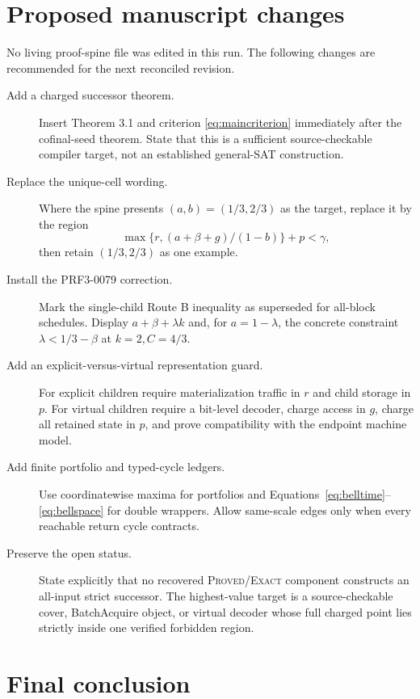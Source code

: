 \documentclass[11pt]{article}
\begin{document}
\section{Proposed manuscript changes}

No living proof-spine file was edited in this run.  The following changes are
recommended for the next reconciled revision.

\begin{description}
\item[Add a charged successor theorem.]
Insert Theorem 3.1 and criterion \eqref{eq:maincriterion} immediately after
the cofinal-seed theorem.  State that this is a sufficient source-checkable
compiler target, not an established general-SAT construction.

\item[Replace the unique-cell wording.]
Where the spine presents $(a,b)=(1/3,2/3)$ as the target, replace it by the
region
\[
 \max\{r,(a+\beta+g)/(1-b)\}+p<\gamma,
\]
then retain $(1/3,2/3)$ as one example.

\item[Install the PRF3-0079 correction.]
Mark the single-child Route B inequality as superseded for all-block
schedules.  Display $a+\beta+\lambda k$ and, for $a=1-\lambda$, the concrete
constraint $\lambda<1/3-\beta$ at $k=2,C=4/3$.

\item[Add an explicit-versus-virtual representation guard.]
For explicit children require materialization traffic in $r$ and child storage
in $p$.  For virtual children require a bit-level decoder, charge access in
$g$, charge all retained state in $p$, and prove compatibility with the
endpoint machine model.

\item[Add finite portfolio and typed-cycle ledgers.]
Use coordinatewise maxima for portfolios and
Equations~\eqref{eq:belltime}--\eqref{eq:bellspace} for double wrappers.  Allow
same-scale edges only when every reachable return cycle contracts.

\item[Preserve the open status.]
State explicitly that no recovered \textsc{Proved/Exact} component constructs
an all-input strict successor.  The highest-value target is a source-checkable
cover, BatchAcquire object, or virtual decoder whose full charged point lies
strictly inside one verified forbidden region.
\end{description}

\section{Final conclusion}
\end{document}
